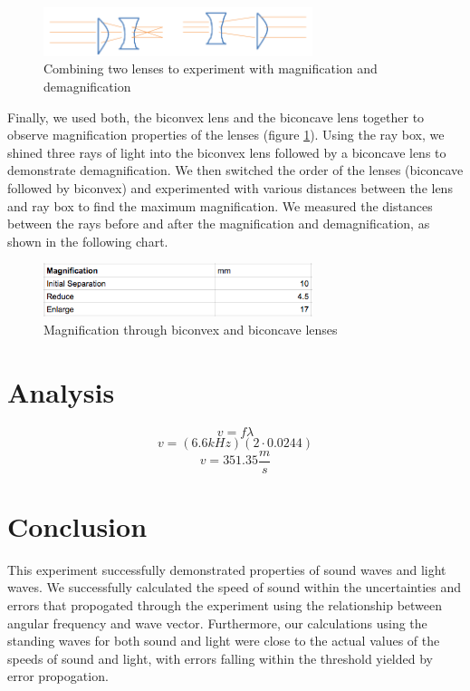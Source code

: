 \documentclass{article}
\begin{document}
\begin{figure}[H]
    \centering
    \includegraphics[width=0.7\textwidth]{charts/magnification}
    \caption{Combining two lenses to experiment with magnification and
    demagnification}
    \label{magnification}
\end{figure}

Finally, we used both, the biconvex lens and the biconcave lens together to observe
magnification properties of the lenses (figure \ref{magnification}). Using the
ray box, we shined three rays of light into the biconvex lens followed by a
biconcave lens to demonstrate demagnification. We then switched the order of the
lenses (biconcave followed by biconvex) and experimented with various distances
between the lens and ray box to find the maximum magnification. We measured the
distances between the rays before and after the magnification and
demagnification, as shown in the following chart.

\begin{figure}[H]
    \centering
    \includegraphics[width=0.7\textwidth]{charts/thick_lenses_magnification}
    \caption{Magnification through biconvex and biconcave lenses}
    \label{thick_lenses_magnification}
\end{figure}

\section{Analysis}

\begin{equation}
    \label{vflambda}
    v = f\lambda
\end{equation}
\begin{equation}
    \label{vflambda_sound1}
    v = (6.6kHz)(2\cdot0.0244)
\end{equation}
\begin{equation}
    \label{vflambda_sound2}
    v = 351.35 \frac{m}{s}
\end{equation}

\section{Conclusion}
This experiment successfully demonstrated properties of sound waves and light
waves. We successfully calculated the speed of sound within the uncertainties
and errors that propogated through the experiment using the relationship between
angular frequency and wave vector. Furthermore, our calculations using the
standing waves for both sound and light were close to the actual values of the
speeds of sound and light, with errors falling within the threshold yielded
by error propogation.
\end{document}
